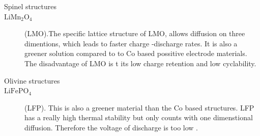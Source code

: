 \documentclass{article}
\begin{document}
\begin{description}
  \item[Spinel structures] 
  \item[$\text{LiMn}_{2}\text{O}_{4}$](LMO).The specific lattice structure
  of LMO, allows diffusion on three dimentions, which leads to faster charge
  -discharge rates. It is also a greener solution compared to to 
  Co based possitive electrode materials. The disadvantage of LMO is t
its low charge retention and low cyclability.
\end{description}

\begin{description}
  \item[Olivine structures] 
  \item[$\text{LiFePO}_{4}$](LFP). This is also a greener material than the 
  Co based structures. LFP has a really high thermal stability but only counts
  with one dimenstional diffusion. Therefore the voltage of discharge
  is too low  \cite{topo} .
\end{description}
\end{document}
